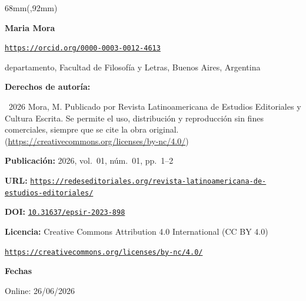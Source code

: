 \documentclass{article}
\newlength{\gbbloquex}
\begin{document}
\begin{textblock*}{68mm}(\gbbloquex,92mm)
{\setlength{\leftskip}{0pt}\setlength{\parindent}{0pt}%
\noindent\begin{minipage}[t]{68mm}
\sffamily\small\setlength{\parskip}{1pt}
{\bfseries\color{azulrevista}Maria Mora}\par
{\scriptsize\texttt{\href{https://orcid.org/0000-0003-0012-4613}{https://orcid.org/0000-0003-0012-4613}}}\par
departamento, Facultad de Filosofía y Letras, Buenos Aires, Argentina\par
\vspace{6pt}
{\bfseries\color{azulrevista!70}Derechos de autor\'ia:}\par
\textcopyright\ 2026 Mora, M. Publicado por Revista Latinoamericana de Estudios Editoriales y Cultura Escrita. Se permite el uso, distribución y reproducción sin fines comerciales, siempre que se cite la obra original. (\href{https://creativecommons.org/licenses/by-nc/4.0/}{https://creativecommons.org/licenses/by-nc/4.0/})\par\vspace{6pt}
{\bfseries\color{azulrevista!70}Publicación:} 2026, vol.~01, n\'um.~01, pp.~1--2\par\vspace{6pt}
{\bfseries\color{azulrevista!70}URL:} {\scriptsize\texttt{\href{https://redeseditoriales.org/revista-latinoamericana-de-estudios-editoriales/}{https://redeseditoriales.org/revista-latinoamericana-de-estudios-editoriales/}}}\par\vspace{6pt}
{\bfseries\color{azulrevista!70}DOI:} {\scriptsize\texttt{\href{https://doi.org/10.31637/epsir-2023-898}{10.31637/epsir-2023-898}}}\par\vspace{6pt}
{\bfseries\color{azulrevista!70}Licencia:} Creative Commons Attribution 4.0 International (CC BY 4.0)\par
{\scriptsize\texttt{\href{https://creativecommons.org/licenses/by-nc/4.0/}{https://creativecommons.org/licenses/by-nc/4.0/}}}\par
\vspace{6pt}
{\bfseries\color{azulrevista!70}Fechas}\par\vspace{2pt}
Online: 26/06/2026\par
\vspace{6pt}
\vspace{6pt}

\end{minipage}}
\end{textblock*}
\end{document}
